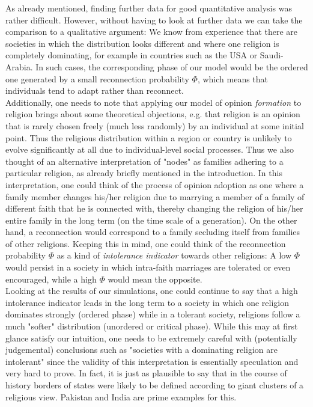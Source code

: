 \documentclass[11pt]{article}
\begin{document}
As already mentioned, finding further data for good quantitative analysis was rather difficult. However, without having to look at further data we can take the comparison to a qualitative argument: We know from experience that there are societies in which the distribution looks different and where one religion is completely dominating, for example in countries such as the USA or Saudi-Arabia. In such cases, the corresponding phase of our model would be the ordered one generated by a small reconnection probability $\Phi$, which means that individuals tend to adapt rather than reconnect. \\


Additionally, one needs to note that applying our model of opinion \emph{formation} to religion brings about some theoretical objections, e.g. that religion is an opinion that is rarely chosen freely (much less randomly) by an individual at some initial point. Thus the religious distribution within a region or country is unlikely to evolve significantly at all due to individual-level social processes. Thus we also thought of an alternative interpretation of "nodes" as families adhering to a particular religion, as already briefly mentioned in the introduction. In this interpretation, one could think of the process of opinion adoption as one where a family member changes his/her religion due to marrying a member of a family of different faith that he is connected with, thereby changing the religion of his/her entire family in the long term (on the time scale of a generation). On the other hand, a reconnection  would correspond to a family secluding itself from families of other religions. Keeping this in mind, one could think of the reconnection probability $\Phi$ as a kind of \emph{intolerance indicator} towards other religions: A low $\Phi$ would persist in a society in which intra-faith marriages are tolerated or even encouraged, while a high $\Phi$ would mean the opposite. \\


Looking at the results of our simulations, one could continue to say that a high intolerance indicator leads in the long term to a society in which one religion dominates strongly (ordered phase) while in a tolerant society, religions follow a much "softer" distribution (unordered or critical phase). While this may at first glance satisfy our intuition, one needs to be extremely careful with (potentially judgemental) conclusions such as "societies with a dominating religion are intolerant" since the validity of this interpretation is essentially speculation and very hard to prove. In fact, it is just as plausible to say that in the course of history borders of states were likely to be defined according to giant clusters of a religious view. Pakistan and India are prime examples for this.
\end{document}
